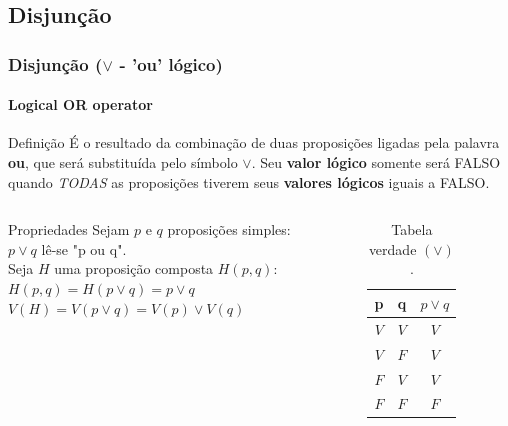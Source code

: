 \documentclass[10pt, headsepline, captions=tableabove, xcolor=table]{beamer}
\begin{document}
\subsection{Disjunção}
%
\begin{frame}[t]
    \frametitle{Disjunção ($\lor$ - 'ou' lógico)}
    \framesubtitle{Logical OR operator}
    \begin{block}{Definição}
        É o resultado da combinação de duas proposições ligadas pela palavra \textbf{ou}, que será substituída pelo símbolo $\lor$. Seu \textbf{valor lógico} somente será FALSO quando \emph{TODAS} as proposições tiverem seus \textbf{valores lógicos} iguais a FALSO.
    \end{block}
    \vspace{-4mm}
    \begin{columns}[t]
        \begin{column}{0.55\textwidth}
            \small
            \begin{alertblock}{Propriedades}
                Sejam $p$ e $q$ proposições simples: \\[2pt]
                $p \lor q$ lê-se "p ou q". \\[2pt]
                Seja $H$ uma proposição composta $H(p,q)$: \\[2pt]
                $H(p,q) = H(p \lor q) = p \lor q$ \\[2pt]
                $V(H) = V(p \lor q) = V(p) \lor V(q)$
            \end{alertblock}
        \end{column}
        \hspace{-10mm}
        \begin{column}{0.4\textwidth}
            \vspace{-3mm}
            \begin{table}[ht]
                \caption{Tabela verdade $(\lor)$.}
                \label{tab:my-table}
                \begin{tabular}{|c|c|c|}
                \hline
                \rowcolor[HTML]{EFEFEF} 
                \textbf{p} & \textbf{q} & \textbf{$p\lor q$} \\ \hline
                $V$        & $V$        & $V$                 \\ \hline
                $V$        & $F$        & $V$                 \\ \hline
                $F$        & $V$        & $V$                 \\ \hline
                $F$        & $F$        & $F$                 \\ \hline
                \end{tabular}
            \end{table}
        \end{column}
    \end{columns}
\end{frame}
\end{document}
